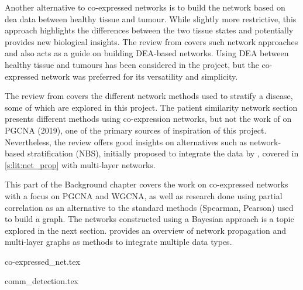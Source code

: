 Another alternative to co-expressed networks is to build the network based on \acrfull{dea} data between healthy tissue and tumour. While slightly more restrictive, this approach highlights the differences between the two tissue states and potentially provides new biological insights. The review from \citet{Van_Dam2018-id} covers such network approaches and also acts as a guide on building DEA-based networks. Using DEA between healthy tissue and tumours has been considered in the project, but the co-expressed network was preferred for its versatility and simplicity.

The review from \citet{Petti2023-qo} covers the different network methods used to stratify a disease, some of which are explored in this project. The patient similarity network section presents different methods using co-expression networks, but not the work of \citet{Care2019-ij} on PGCNA (2019), one of the primary sources of inspiration of this project. Nevertheless, the review offers good insights on alternatives such as network-based stratification (NBS), initially proposed to integrate the data by \citet{Hofree2013-ld}, covered in \cref{s:lit:net_prop} with multi-layer networks.

This part of the Background chapter covers the work on co-expressed networks with a focus on PGCNA and WGCNA, as well as research done using partial correlation as an alternative to the standard methods (Spearman, Pearson) used to build a graph. The networks constructed using a Bayesian approach is a topic explored in the next section.  provides an overview of network propagation and multi-layer graphs as methods to integrate multiple data types.

{co-expressed_net.tex}

{comm_detection.tex}





